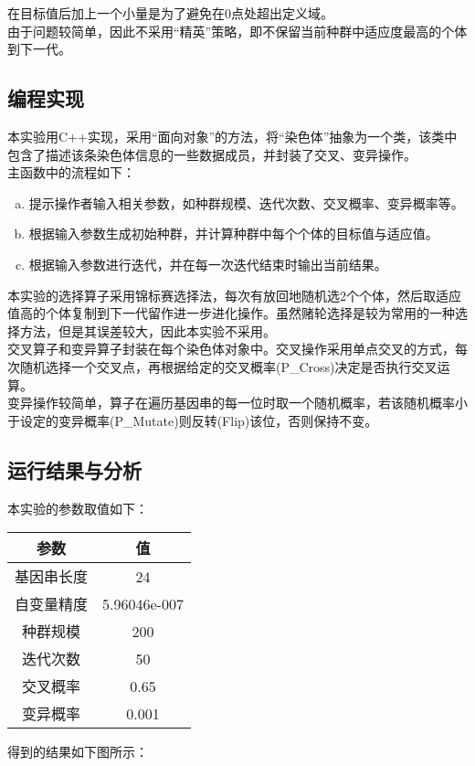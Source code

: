 \documentclass[UTF8]{ctexart}
\begin{document}
\indent 在目标值后加上一个小量是为了避免在0点处超出定义域。\\
\indent 由于问题较简单，因此不采用“精英”策略，即不保留当前种群中适应度最高的个体到下一代。\\

\subsection{编程实现}
本实验用C++实现，采用“面向对象”的方法，将“染色体”抽象为一个类，该类中包含了描述该条染色体信息的一些数据成员，并封装了交叉、变异操作。\\
\indent 主函数中的流程如下：
\begin{enumerate}[(a)]
\item 提示操作者输入相关参数，如种群规模、迭代次数、交叉概率、变异概率等。
\item 根据输入参数生成初始种群，并计算种群中每个个体的目标值与适应值。
\item 根据输入参数进行迭代，并在每一次迭代结束时输出当前结果。
\end{enumerate}
\indent 本实验的选择算子采用锦标赛选择法，每次有放回地随机选2个个体，然后取适应值高的个体复制到下一代留作进一步进化操作。虽然赌轮选择是较为常用的一种选择方法，但是其误差较大，因此本实验不采用。\\
\indent 交叉算子和变异算子封装在每个染色体对象中。交叉操作采用单点交叉的方式，每次随机选择一个交叉点，再根据给定的交叉概率(P\_Cross)决定是否执行交叉运算。\\
\indent 变异操作较简单，算子在遍历基因串的每一位时取一个随机概率，若该随机概率小于设定的变异概率(P\_Mutate)则反转(Flip)该位，否则保持不变。

\subsection{运行结果与分析}
本实验的参数取值如下：
\begin{center}
\begin{tabular}{cc}
  \toprule
  参数 & 值 \\
  \midrule
  基因串长度 & 24 \\
  自变量精度 & 5.96046e-007\\
  种群规模   & 200 \\
  迭代次数   & 50 \\
  交叉概率   & 0.65 \\
  变异概率   & 0.001 \\
  \bottomrule
\end{tabular}
\end{center}
得到的结果如下图所示：
\begin{center}
\end{center}
\end{document}
